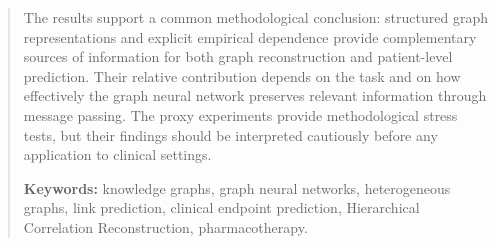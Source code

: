 \begin{abstract}
The results support a common methodological conclusion: structured graph representations and explicit empirical dependence provide complementary sources of information for both graph reconstruction and patient-level prediction.
Their relative contribution depends on the task and on how effectively the graph neural network preserves relevant information through message passing.
The proxy experiments provide methodological stress tests, but their 
findings should be interpreted cautiously before any application to clinical settings.

\medskip
\noindent\textbf{Keywords:}
knowledge graphs,
graph neural networks,
heterogeneous graphs,
link prediction,
clinical endpoint prediction,
Hierarchical Correlation Reconstruction,
pharmacotherapy.
\end{abstract}
